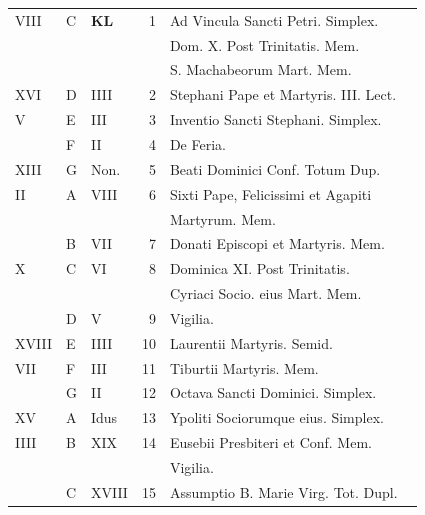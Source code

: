 \begin{center}
\begin{tabular}{l | l | l | r | l l}
\color{Red} VIII & C & \textbf{\color{Red} K\color{Blue}L} & 1 & Ad Vincula Sancti Petri. Simplex. & \color{Red} \\
 &  &  &  & \quad Dom. X. Post Trinitatis. Mem. \\
 &  & &  & \multicolumn{2}{l}{\quad S. Machabeorum Mart. Mem. \color{Red}} \\
\color{Red} XVI & D & \color{Red} IIII & 2 & \color{Red} Stephani Pape et Martyris. III. Lect. \\
\color{Red} V & E & \color{Red} III & 3 & \color{Red} Inventio Sancti Stephani. Simplex. \\
\color{Red}  & F & \color{Red} II & 4 & De Feria. & \color{Red} \\
\color{Red} XIII & G & \color{Red} Non. & 5 & Beati Dominici Conf. Totum Dup. & \color{Red} \\
\color{Red} II & \color{Red} A & \color{Red} VIII & 6 & \multicolumn{2}{l}{Sixti Pape, Felicissimi et Agapiti}\\
 &  & &  & \quad Martyrum. Mem. \color{Red} \\
\color{Red}  & B & \color{Red} VII & 7 & Donati Episcopi et Martyris. Mem. & \color{Red} \\
\color{Red} X & C & \color{Red} VI & 8 & Dominica XI. Post Trinitatis. \\
 &  & &  & \quad Cyriaci Socio. eius Mart. Mem. & \color{Red} \\
\color{Red}  & D & \color{Red} V & 9 & \qquad \color{Red} Vigilia. \\
\color{Red} XVIII & E & \color{Red} IIII & 10 & \color{Red} Laurentii Martyris. Semid. & \color{Red} \\
\color{Red} VII & F & \color{Red} III & 11 & Tiburtii Martyris. Mem. & \color{Red} \\
\color{Red}  & G & \color{Red} II & 12 & Octava Sancti Dominici. Simplex. & \color{Red} \\
\color{Red} XV & \color{Red} A & \color{Red} Idus & 13 & Ypoliti Sociorumque eius. Simplex. & \color{Red} \\
\color{Red} IIII & B & \color{Red} XIX & 14 & Eusebii Presbiteri et Conf. Mem. & \\
 &  & &  & \qquad \color{Red} Vigilia. \\
\color{Red}  & C & \color{Red} XVIII & 15 & \multicolumn{2}{l}{\color{Red} Assumptio B. Marie Virg. Tot. Dupl.} \color{Red} \\

\end{tabular}
\end{center}

